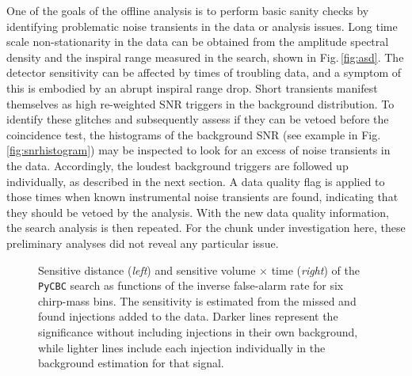 \documentclass[binding=0.6cm, LaM]{sapthesis}
\begin{document}
	One of the goals of the offline analysis is to perform basic sanity checks 
	by identifying problematic noise transients in the data or analysis issues.
	Long time scale non-stationarity in the data can be obtained from the amplitude spectral density 
	and the inspiral range measured in the search, shown in Fig.\,\ref{fig:asd}.
	The detector sensitivity can be affected by times of troubling data, 
	and a symptom of this is embodied by an abrupt inspiral range drop.
	Short transients manifest themselves as high re-weighted SNR triggers in the background distribution. 
	To identify these glitches and subsequently assess if they can be vetoed before the coincidence test, 
	the histograms of the background SNR (see example in Fig.\,\ref{fig:snrhistogram}) 
	may be inspected to look for an excess of noise transients in the data.
	Accordingly, the loudest background triggers are followed up individually, 
	as described in the next section.
	A data quality flag is applied to those times when known instrumental noise transients are found, 
	indicating that they should be vetoed by the analysis. 
	With the new data quality information, the search analysis is then repeated.
        For the chunk under investigation here, these preliminary analyses did not reveal any particular issue.

        \begin{figure}[t]
          \noindent
          \label{sens_vt}
          \centering
          \caption{Sensitive distance (\textit{left}) and sensitive volume $\times$ time (\textit{right}) of the {\texttt{PyCBC}} search as functions of the inverse false-alarm rate for six chirp-mass bins. The sensitivity is estimated from the missed and found injections added to the data. Darker lines represent the significance without including injections in their own background, while lighter lines include each injection individually in the background estimation for that signal.}
          \label{fig:sens_vt}
        \end{figure}
\end{document}

